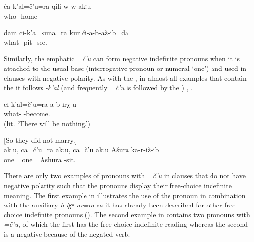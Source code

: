 \begin{exe}
	\ex	\label{ex:Nobody is at home}
	\gll	ča-k'al=č'u=ra	qili-w	w-akːu\\
		who-	home-\tsc{m}	-\\
	\glt	{}

	\ex	\label{ex:I do not see any pit}
	\gll	dam	ci-k'a=ʁuna=ra	kur	či-a-b-až-ib=da\\
			what-	pit	-see.\\
	\glt	{}
\end{exe}

Similarly, the emphatic  \textit{=č'u} can form negative indefinite pronouns when it is attached to the usual base (interrogative pronoun or numeral `one') and used in clauses with negative polarity. As with the , in almost all examples that contain the  it follows \textit{-k'al} (and frequently \textit{=č'u} is followed by the ) , . 

\begin{exe}
	\ex	\label{ex:Nothing bad will happen.} 
	\gll	ci-k'al=č'u=ra	a-b-irχ-u\\
		what-	-become.\\
	\glt	{} (lit. `There will be nothing.')

	\ex	\label{ex:No, there was no one, except for Ashura he did not marry anyone.} [So they did not marry.]\\
	\gll	akːu,		ca=č'u=ra	akːu,	ca=č'u	akːu	Ašura	ka-r-iž-ib\\
				one=			one=		Ashura	-sit.\\
	\glt	{}
\end{exe}

There are only two examples of pronouns with \textit{=č'u} in clauses that do not have negative polarity such that the pronouns display their free-choice indefinite meaning. The first example in  illustrates the use of the pronoun in combination with the  auxiliary \textit{b-iχʷ-ar=ra} as it has already been described for other free-choice indefinite pronouns (). The second example in  contains two pronouns with \textit{=č'u}, of which the first has the free-choice indefinite reading whereas the second is a negative  because of the negated verb.

